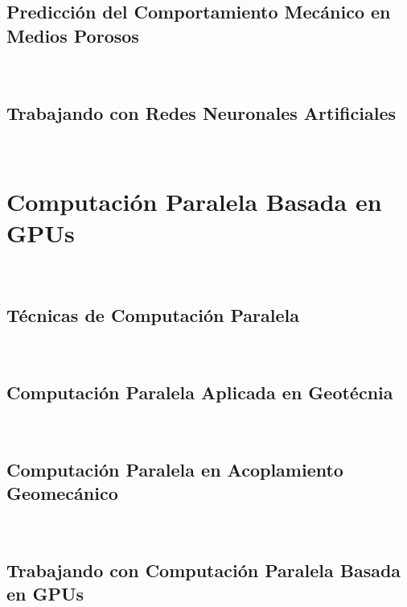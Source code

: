 \subsection{Predicción del Comportamiento Mecánico en Medios Porosos}~\hypertarget{sec:sec413}{}
\label{sec:sec413}

\subsection{Trabajando con Redes Neuronales Artificiales}~\hypertarget{sec:sec414}{}
\label{sec:sec414}


\section{Computación Paralela Basada en GPUs}~\hypertarget{sec:sec420}{}
\label{sec:sec420}

\lipsum[3-4]

\bigskip


\subsection{Técnicas de Computación Paralela}~\hypertarget{sec:sec421}{}
\label{sec:sec421}

\subsection{Computación Paralela Aplicada en Geotécnia}~\hypertarget{sec:sec422}{}
\label{sec:sec422}



\subsection{Computación Paralela en Acoplamiento Geomecánico}~\hypertarget{sec:sec423}{}
\label{sec:sec423}


\subsection{Trabajando con Computación Paralela Basada en GPUs}~\hypertarget{sec:sec424}{}
\label{sec:sec424}



